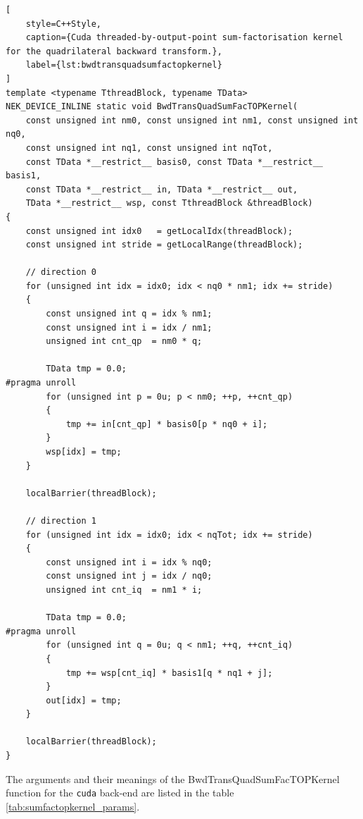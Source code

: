 \begin{minipage}{\textwidth}
\begin{lstlisting}[
    style=C++Style,
    caption={Cuda threaded-by-output-point sum-factorisation kernel for the quadrilateral backward transform.},
    label={lst:bwdtransquadsumfactopkernel}
]
template <typename TthreadBlock, typename TData>
NEK_DEVICE_INLINE static void BwdTransQuadSumFacTOPKernel(
    const unsigned int nm0, const unsigned int nm1, const unsigned int nq0,
    const unsigned int nq1, const unsigned int nqTot,
    const TData *__restrict__ basis0, const TData *__restrict__ basis1,
    const TData *__restrict__ in, TData *__restrict__ out,
    TData *__restrict__ wsp, const TthreadBlock &threadBlock)
{
    const unsigned int idx0   = getLocalIdx(threadBlock);
    const unsigned int stride = getLocalRange(threadBlock);

    // direction 0
    for (unsigned int idx = idx0; idx < nq0 * nm1; idx += stride)
    {
        const unsigned int q = idx % nm1;
        const unsigned int i = idx / nm1;
        unsigned int cnt_qp  = nm0 * q;

        TData tmp = 0.0;
#pragma unroll
        for (unsigned int p = 0u; p < nm0; ++p, ++cnt_qp)
        {
            tmp += in[cnt_qp] * basis0[p * nq0 + i];
        }
        wsp[idx] = tmp;
    }

    localBarrier(threadBlock);

    // direction 1
    for (unsigned int idx = idx0; idx < nqTot; idx += stride)
    {
        const unsigned int i = idx % nq0;
        const unsigned int j = idx / nq0;
        unsigned int cnt_iq  = nm1 * i;

        TData tmp = 0.0;
#pragma unroll
        for (unsigned int q = 0u; q < nm1; ++q, ++cnt_iq)
        {
            tmp += wsp[cnt_iq] * basis1[q * nq1 + j];
        }
        out[idx] = tmp;
    }

    localBarrier(threadBlock);
}
\end{lstlisting}
\end{minipage}

The arguments and their meanings of the BwdTransQuadSumFacTOPKernel function for the \texttt{cuda} back-end are listed in the table \ref{tab:sumfactopkernel_params}.

